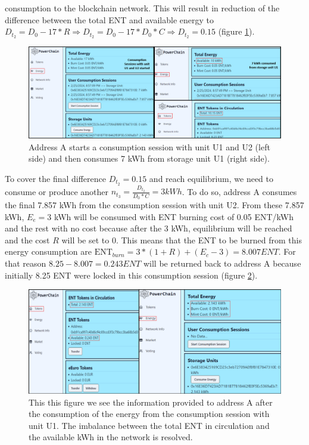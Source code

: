 consumption to the blockchain network. This will result in reduction of the difference between the total ENT and available energy to $D_{t_2} = D_0 - 17*R \Rightarrow 
D_{t_2} = D_0 - 17*D_0*C \Rightarrow D_{t_2} = 0.15$ (figure \ref{fig:reduce_imbalance_2}).
\begin{figure}[h!]
    \centering
    \includegraphics[width=\linewidth,frame,scale=1]{Figures/reduce_imbalance_2.png}
    \caption{Address A starts a consumption session with unit U1 and U2 (left side) and then consumes 7 kWh from storage unit U1 (right side).}
    \label{fig:reduce_imbalance_2}
\end{figure}
To cover the final difference $D_{t_2} = 0.15$ and reach equilibrium, we need to consume or produce another $n_{t_3} = \frac{D_{t_2}}{D_0*C} = 3 kWh$. To do
so, address A consumes the final 7.857 kWh from the consumption session with unit U2. From these 7.857 kWh, $E_e=3$ kWh will be consumed with ENT burning cost of 0.05 ENT/kWh
and the rest with no cost because after the 3 kWh, equilibrium will be reached and the cost $R$ will be set to 0. This means that the ENT to be burned from this energy
consumption are $\textrm{ENT}_{burn} = 3*(1+R) + (E_c-3) = 8.007 ENT$. For that reason $8.25 - 8.007 = 0.243 ENT$ will be returned back to address A because initially 8.25 ENT were
locked in this consumption session (figure \ref{fig:resolve_imbalance}). \\
\begin{figure}[h!]
    \centering
    \includegraphics[width=\linewidth,frame,scale=1]{Figures/resolve_imbalance.png}
    \caption{This this figure we see the information provided to address A after the consumption of the energy from the consumption session with unit U1. The imbalance between the total
    ENT in circulation and the available kWh in the network is resolved.}
    \label{fig:resolve_imbalance}
\end{figure}
